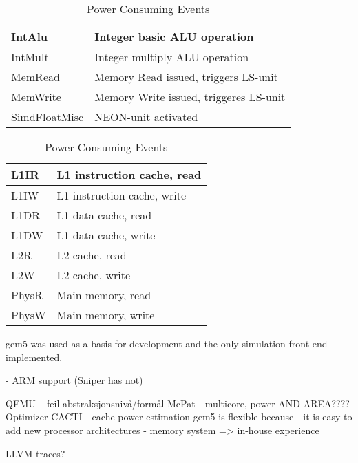 \begin{table}[ht]
    \centering
    \begin{minipage}[b]{\linewidth}
        \centering
        \begin{tabular}{|l|l|}
            \hline
            IntAlu    & Integer basic ALU operation\\
            \hline
            IntMult    & Integer multiply ALU operation \\
            \hline
            MemRead    & Memory Read issued, triggers LS-unit \\
            \hline
            MemWrite    & Memory Write issued, triggeres LS-unit \\
            \hline
            SimdFloatMisc     & NEON-unit activated \\
            \hline
        \end{tabular}
    \end{minipage}

    \begin{minipage}[b]{\linewidth}
        \centering
        \begin{tabular}{|l|l|}
            \hline
            L1IR    & L1 instruction cache, read \\
            \hline
            L1IW    & L1 instruction cache, write \\
            \hline
            L1DR    & L1 data cache, read \\
            \hline
            L1DW    & L1 data cache, write \\
            \hline
            L2R     & L2 cache, read \\
            \hline
            L2W     & L2 cache, write \\
            \hline
            PhysR   & Main memory, read \\
            \hline
            PhysW   & Main memory, write \\
            \hline
        \end{tabular}
    \end{minipage}
    \caption{Power Consuming Events}
    \label{tbl:events}
\end{table}


gem5 was used as a basis for development and the only simulation front-end
implemented.




- ARM support (Sniper has not)

QEMU -- feil abstraksjonsnivå/formål
McPat - multicore, power AND AREA???? Optimizer
CACTI - cache power estimation
gem5 is flexible because
- it is easy to add new processor architectures
- memory system
=> in-house experience

LLVM traces?

